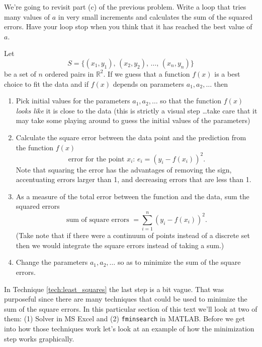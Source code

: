 \begin{problem}
    We're going to revisit part (c) of the previous problem.  Write a loop that tries many
    values of $a$ in very small increments and calculates the sum of the squared errors.
    Have your loop stop when you think that it has reached the best value of $a$.
\end{problem}


\begin{technique}\label{tech:least_squares}
    Let 
    \[ S = \{ (x_1, y_1), \, (x_2, y_2), \, \ldots, \, (x_n, y_n) \} \] 
    be a set of $n$
    ordered pairs in $\mathbb{R}^2$.  If we guess that a function $f(x)$ is a best choice
    to fit the data and if $f(x)$ depends on parameters $a_1, a_2, \ldots$ then 
    \begin{enumerate}
        \item Pick initial values for the parameters $a_1, a_2, \ldots$ so that the
            function $f(x)$ {\it looks like} it is close to the data (this is strictly a
            visual step \ldots take care that it may take some playing around to guess the
            initial values of the parameters)
        \item Calculate the square error between the data point and the prediction from the
            function $f(x)$
            \[ \text{error for the point $x_i$: } e_i = \left( y_i - f(x_i) \right)^2. \]
            Note that squaring the error has the advantages of removing the sign,
            accentuating errors larger than 1, and decreasing errors that are less than 1.
        \item As a measure of the total error between the function and the data, sum the
            squared errors 
            \[ \text{sum of square errors } = \sum_{i=1}^n \left( y_i - f(x_i) \right)^2.
            \]
            (Take note that if there were a continuum of points instead of a discrete set
            then we would integrate the square errors instead of taking a sum.)
        \item Change the parameters $a_1, a_2, \ldots$ so as to minimize the sum of the
            square errors.
    \end{enumerate}
\end{technique}

In Technique \ref{tech:least_squares} the last step is a bit vague.  That was purposeful
since there are many techniques that could be used to minimize the sum of the square
errors.  In this particular section of this text we'll look at two of them: (1) Solver in
MS Excel and (2) \texttt{fminsearch} in MATLAB.  Before we get into how those techniques
work let's look at an example of how the minimization step works graphically.


